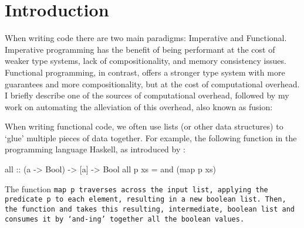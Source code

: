 \section{Introduction}
When writing code there are two main paradigms: Imperative and Functional.
Imperative programming has the benefit of being performant at the cost of weaker type systems, lack of compositionality, and memory consistency issues.
Functional programming, in contrast, offers a stronger type system with more guarantees and more compositionality, but at the cost of computational overhead.
I briefly describe one of the sources of computational overhead, followed by my work on automating the alleviation of this overhead, also known as fusion:

When writing functional code, we often use lists (or other data structures) to `glue' multiple pieces of data together.
For example, the following function in the programming language Haskell, as introduced by \cite{Gill1993}:
\begin{code}
all :: (a -> Bool) -> [a] -> Bool
all p xs = and (map p xs)
\end{code}
The function \tt{map p} traverses across the input list, applying the predicate \tt{p} to each element, resulting in a new boolean list.
Then, the function \tt{and} takes this resulting, intermediate, boolean list and consumes it by `and-ing' together all the boolean values.

